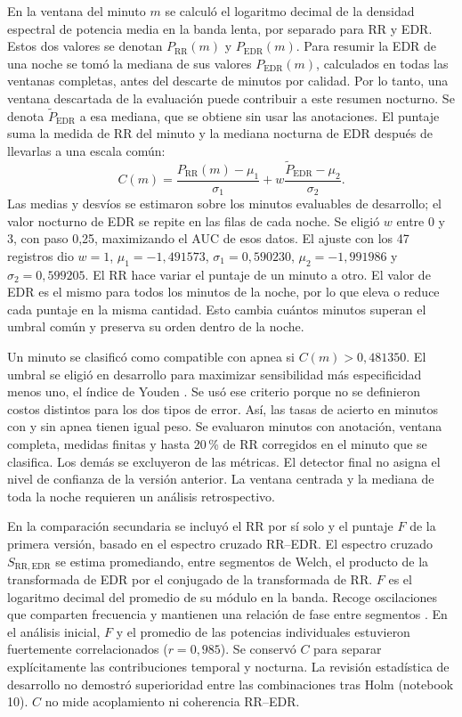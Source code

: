 \documentclass[10pt,a4paper]{article}
\begin{document}
En la ventana del minuto $m$ se calculó el logaritmo decimal de la densidad espectral de potencia media en la banda lenta, por separado para RR y EDR. Estos dos valores se denotan $P_{\mathrm{RR}}(m)$ y $P_{\mathrm{EDR}}(m)$. Para resumir la EDR de una noche se tomó la mediana de sus valores $P_{\mathrm{EDR}}(m)$, calculados en todas las ventanas completas, antes del descarte de minutos por calidad. Por lo tanto, una ventana descartada de la evaluación puede contribuir a este resumen nocturno. Se denota $\widetilde P_{\mathrm{EDR}}$ a esa mediana, que se obtiene sin usar las anotaciones. El puntaje suma la medida de RR del minuto y la mediana nocturna de EDR después de llevarlas a una escala común:
\[
 C(m)=\frac{P_{\mathrm{RR}}(m)-\mu_1}{\sigma_1}
      +w\frac{\widetilde P_{\mathrm{EDR}}-\mu_2}{\sigma_2}.
\]
Las medias y desvíos se estimaron sobre los minutos evaluables de desarrollo; el valor nocturno de EDR se repite en las filas de cada noche. Se eligió $w$ entre 0 y 3, con paso 0,25, maximizando el AUC de esos datos. El ajuste con los 47 registros dio $w=1$, $\mu_1=-1{,}491573$, $\sigma_1=0{,}590230$, $\mu_2=-1{,}991986$ y $\sigma_2=0{,}599205$. El RR hace variar el puntaje de un minuto a otro. El valor de EDR es el mismo para todos los minutos de la noche, por lo que eleva o reduce cada puntaje en la misma cantidad. Esto cambia cuántos minutos superan el umbral común y preserva su orden dentro de la noche.

Un minuto se clasificó como compatible con apnea si $C(m)>0{,}481350$. El umbral se eligió en desarrollo para maximizar sensibilidad más especificidad menos uno, el índice de Youden \cite{youden}. Se usó ese criterio porque no se definieron costos distintos para los dos tipos de error. Así, las tasas de acierto en minutos con y sin apnea tienen igual peso. Se evaluaron minutos con anotación, ventana completa, medidas finitas y hasta 20\,\% de RR corregidos en el minuto que se clasifica. Los demás se excluyeron de las métricas. El detector final no asigna el nivel de confianza de la versión anterior. La ventana centrada y la mediana de toda la noche requieren un análisis retrospectivo.

En la comparación secundaria se incluyó el RR por sí solo y el puntaje $F$ de la primera versión, basado en el espectro cruzado RR--EDR. El espectro cruzado $S_{\mathrm{RR,EDR}}$ se estima promediando, entre segmentos de Welch, el producto de la transformada de EDR por el conjugado de la transformada de RR. $F$ es el logaritmo decimal del promedio de su módulo en la banda. Recoge oscilaciones que comparten frecuencia y mantienen una relación de fase entre segmentos \cite{carter}. En el análisis inicial, $F$ y el promedio de las potencias individuales estuvieron fuertemente correlacionados ($r=0{,}985$). Se conservó $C$ para separar explícitamente las contribuciones temporal y nocturna. La revisión estadística de desarrollo no demostró superioridad entre las combinaciones tras Holm (notebook 10). $C$ no mide acoplamiento ni coherencia RR--EDR.
\end{document}
